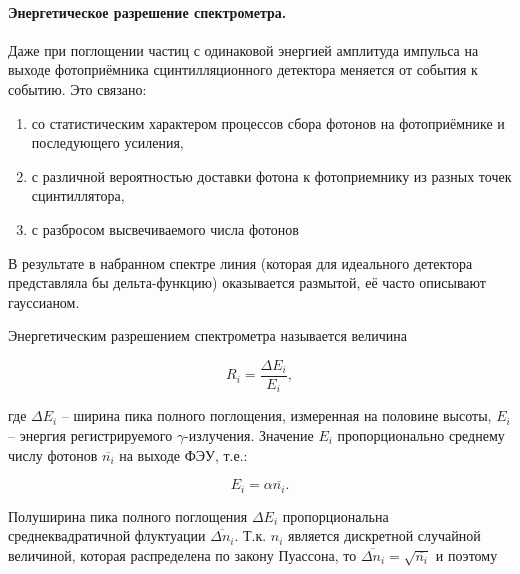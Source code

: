 \documentclass[a4paper,12pt]{article} %
\begin{document}
\medskip

\noindent \paragraph{Энергетическое разрешение спектрометра.} Даже при поглощении частиц с одинаковой энергией амплитуда импульса на выходе фотоприёмника сцинтилляционного детектора меняется от события к событию. Это связано:

\medskip

\begin{enumerate}
\item со статистическим характером процессов сбора фотонов на фотоприёмнике и последующего усиления,
\item с различной вероятностью доставки фотона к фотоприемнику из разных точек сцинтиллятора,
\item с разбросом высвечиваемого числа фотонов
\end{enumerate}

\medskip

\noindent В результате в набранном спектре линия (которая для идеального детектора представляла бы дельта-функцию) оказывается размытой, её часто описывают гауссианом.\par
Энергетическим разрешением спектрометра называется величина

\medskip

\begin{equation}
R_i=\frac{\Delta E_i}{E_i},
\end{equation}

\medskip

\noindent где $\Delta E_i$ -- ширина пика полного поглощения, измеренная на половине высоты, $E_i$ -- энергия регистрируемого $\gamma$-излучения. Значение $E_i$ пропорционально среднему числу фотонов $\overline{n_i}$ на выходе ФЭУ, т.е.:

\medskip

\begin{equation}
E_i=\alpha\overline{n_i}.
\label{eq:4}
\end{equation}

\medskip

\noindent Полуширина пика полного поглощения $\Delta E_i$ пропорциональна среднеквадратичной флуктуации $\overline{\Delta n_i}$. Т.к. $n_i$ является дискретной случайной величиной, которая распределена по закону Пуассона, то $\overline{\Delta n_i}=\sqrt{\overline{n_i}}$ и поэтому

\medskip
\end{document}
